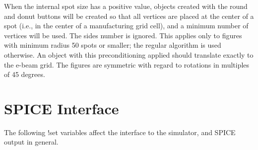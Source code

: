 \begin{description}
When the internal spot size has a positive value, objects created with
the {\cb round} and {\cb donut} buttons will be created so that all
vertices are placed at the center of a spot (i.e., in the center of a
manufacturing grid cell), and a minimum number of vertices will be
used.  The {\cb sides} number is ignored.  This applies only to
figures with minimum radius 50 spots or smaller; the regular algorithm
is used otherwise.  An object with this preconditioning applied should
translate exactly to the e-beam grid.  The figures are symmetric with
regard to rotations in multiples of 45 degrees.
\end{description}


\section{SPICE Interface}
\label{spicevars}

The following {\cb !set} variables affect the interface to the
{\WRspice} simulator, and SPICE output in general.

